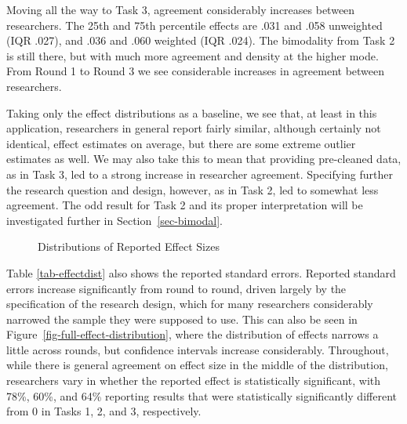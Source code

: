 \documentclass[
  letterpaper,
  DIV=11,
  numbers=noendperiod]{scrartcl}
\begin{document}
Moving all the way to Task 3, agreement considerably increases between
researchers. The 25th and 75th percentile effects are .031 and .058
unweighted (IQR .027), and .036 and .060 weighted (IQR .024). The
bimodality from Task 2 is still there, but with much more agreement and
density at the higher mode. From Round 1 to Round 3 we see considerable
increases in agreement between researchers.

Taking only the effect distributions as a baseline, we see that, at
least in this application, researchers in general report fairly similar,
although certainly not identical, effect estimates on average, but there
are some extreme outlier estimates as well. We may also take this to
mean that providing pre-cleaned data, as in Task 3, led to a strong
increase in researcher agreement. Specifying further the research
question and design, however, as in Task 2, led to somewhat less
agreement. The odd result for Task 2 and its proper interpretation will
be investigated further in Section~\ref{sec-bimodal}.

\begin{figure}


\caption{\label{fig-effect-distributions}Distributions of Reported
Effect Sizes}

\end{figure}%

Table \ref{tab-effectdist} also shows the reported standard errors.
Reported standard errors increase significantly from round to round,
driven largely by the specification of the research design, which for
many researchers considerably narrowed the sample they were supposed to
use. This can also be seen in Figure~\ref{fig-full-effect-distribution},
where the distribution of effects narrows a little across rounds, but
confidence intervals increase considerably. Throughout, while there is
general agreement on effect size in the middle of the distribution,
researchers vary in whether the reported effect is statistically
significant, with 78\%, 60\%, and 64\% reporting results that were
statistically significantly different from 0 in Tasks 1, 2, and 3,
respectively.
\end{document}
